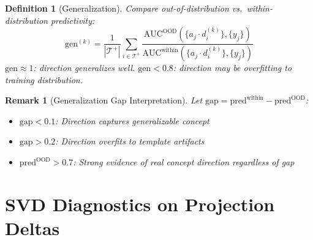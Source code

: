 \documentclass[11pt]{article}
\newtheorem{definition}{Definition}[section]
\newtheorem{remark}{Remark}[section]
\begin{document}
\begin{definition}[Generalization]
Compare out-of-distribution vs.\ within-distribution predictivity:
\begin{equation}
\text{gen}^{(k)} = \frac{1}{|\mathcal{T}^+|} \sum_{i \in \mathcal{T}^+} \frac{\text{AUC}^{\text{OOD}}(\{a_j \cdot d^{(k)}_i\}, \{y_j\})}{\text{AUC}^{\text{within}}(\{a_j \cdot d^{(k)}_i\}, \{y_j\})}
\end{equation}
$\text{gen} \approx 1$: direction generalizes well. $\text{gen} < 0.8$: direction may be overfitting to training distribution.
\end{definition}

\begin{remark}[Generalization Gap Interpretation]
Let $\text{gap} = \text{pred}^{\text{within}} - \text{pred}^{\text{OOD}}$:
\begin{itemize}[nosep]
\item $\text{gap} < 0.1$: Direction captures generalizable concept
\item $\text{gap} > 0.2$: Direction overfits to template artifacts
\item $\text{pred}^{\text{OOD}} > 0.7$: Strong evidence of real concept direction regardless of gap
\end{itemize}
\end{remark}

\section{SVD Diagnostics on Projection Deltas}
\label{app:svd-diagnostics}
\end{document}
